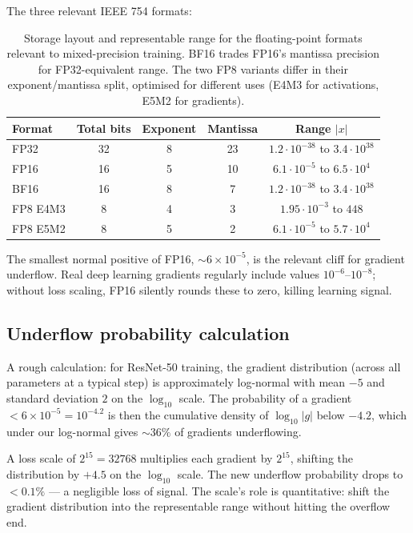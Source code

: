 The three relevant IEEE 754 formats:

\begin{table}[t]
\centering
\small
\begin{tabular}{lcccc}
\toprule
Format & Total bits & Exponent & Mantissa & Range $|x|$ \\
\midrule
FP32   & 32  & 8 & 23 & $1.2 \cdot 10^{-38}$ to $3.4 \cdot 10^{38}$ \\
FP16   & 16  & 5 & 10 & $6.1 \cdot 10^{-5}$  to $6.5 \cdot 10^{4}$ \\
BF16   & 16  & 8 & 7  & $1.2 \cdot 10^{-38}$ to $3.4 \cdot 10^{38}$ \\
FP8 E4M3 & 8 & 4 & 3 & $1.95 \cdot 10^{-3}$ to $448$ \\
FP8 E5M2 & 8 & 5 & 2 & $6.1 \cdot 10^{-5}$ to $5.7 \cdot 10^{4}$ \\
\bottomrule
\end{tabular}
\caption[IEEE 754 format comparison.]{Storage layout and
representable range for the floating-point formats relevant to
mixed-precision training. BF16 trades FP16's mantissa precision
for FP32-equivalent range. The two FP8 variants
\cite{micikevicius_fp8_2022} differ in their exponent/mantissa
split, optimised for different uses (E4M3 for activations,
E5M2 for gradients).}
\label{tab:amp:fp_formats}
\end{table}

The smallest normal positive of FP16, $\sim 6 \times 10^{-5}$,
is the relevant cliff for gradient underflow. Real deep
learning gradients regularly include values $10^{-6}$--$10^{-8}$;
without loss scaling, FP16 silently rounds these to zero,
killing learning signal.

\subsection{Underflow probability calculation}
\label{ssec:amp:underflow_calc}

A rough calculation: for ResNet-50 training, the gradient
distribution (across all parameters at a typical step) is
approximately log-normal with mean $-5$ and standard deviation
$2$ on the $\log_{10}$ scale. The probability of a gradient
$< 6 \times 10^{-5} = 10^{-4.2}$ is then the cumulative density
of $\log_{10}|g|$ below $-4.2$, which under our log-normal
gives $\sim 36\%$ of gradients underflowing.

A loss scale of $2^{15} = 32768$ multiplies each gradient by
$2^{15}$, shifting the distribution by $+4.5$ on the
$\log_{10}$ scale. The new underflow probability drops to
$<0.1\%$ --- a negligible loss of signal. The scale's role is
quantitative: shift the gradient distribution into the
representable range without hitting the overflow end.

